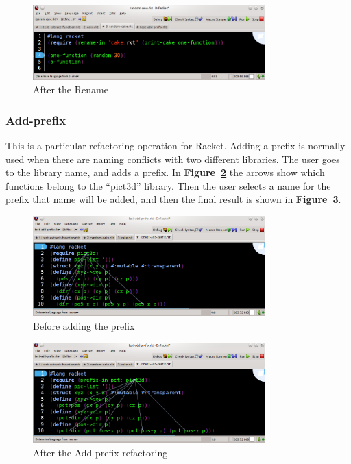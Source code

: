 \begin{figure}[htbp]
	\centering
	\includegraphics[width=0.8\textwidth]{img/renameV2-2.png}
	\caption{After the Rename}
	\label{fig:renameAfter}
\end{figure}

\subsubsection{Add-prefix}

This is a particular refactoring operation for Racket. Adding a prefix is normally used when there are naming conflicts with two different libraries. The user goes to the library name, and adds a prefix.
In {\bf Figure~\ref{fig:addPrefixBefore}} the arrows show which functions belong to the ``pict3d'' library.
Then the user selects a name for the prefix that name will be added, and then the final result is shown in {\bf Figure~\ref{fig:addPrefixAfter}}.

\begin{figure}[hb!]
	\centering
	\includegraphics[width=0.8\textwidth]{img/add-prefixV2-1.png}
	\caption{Before adding the prefix}
	\label{fig:addPrefixBefore}
\end{figure}


\begin{figure}[hb!]
	\centering
	\includegraphics[width=0.8\textwidth]{img/add-prefixV2-3.png}
	\caption{After the Add-prefix refactoring}
	\label{fig:addPrefixAfter}
\end{figure}